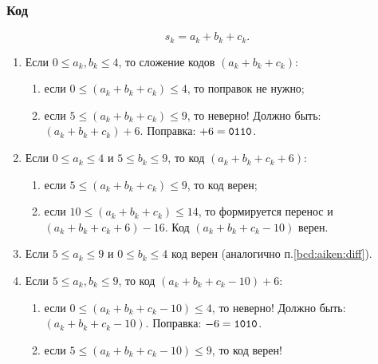 \begin{frame}
    \frametitle{Код \AikenLabel}

    \[
        s_k=a_k+b_k+c_k.
    \]
    
    \begin{enumerate}
        \item Если $0\leq a_{k},b_{k}\leq 4$, то сложение кодов $(a_{k}+b_{k}+c_{k})$:
        \begin{enumerate}
            \item если $0\leq (a_{k}+b_{k}+c_{k}) \leq 4$, то поправок не нужно;
            \item если $5\leq(a_{k}+b_{k}+c_{k}) \leq 9$, то неверно! Должно быть: $(a_{k}+b_{k}+c_{k})+6$. Поправка: $+6=\texttt{0110}$.
        \end{enumerate}

        \item\label{bcd:aiken:diff} Если $0\leq a_{k}\leq 4$ и $5\leq b_{k}\leq 9$, то код $(a_{k}+b_{k}+c_{k}+6)$:
        \begin{enumerate}
            \item если $5\leq (a_{k}+b_{k}+c_{k}) \leq 9$, то код верен;
            \item если $10\leq(a_{k}+b_{k}+c_{k}) \leq 14$, то формируется перенос и $(a_{k}+b_{k}+c_{k}+6)-16$. Код $(a_{k}+b_{k}+c_{k}-10)$ верен.
        \end{enumerate}
        
        \item Если $5\leq a_{k}\leq 9$ и $0\leq b_{k}\leq 4$ код верен (аналогично п.\ref{bcd:aiken:diff}).

        \item Если $5\leq a_{k},b_{k}\leq 9$, то код $(a_{k}+b_{k}+c_{k}-10)+6$:
        \begin{enumerate}
            \item если $0\leq (a_{k}+b_{k}+c_{k}-10) \leq 4$, то неверно! Должно быть: $(a_{k}+b_{k}+c_{k} - 10)$. Поправка: $-6=\texttt{1010}$.
            \item если $5\leq(a_{k}+b_{k}+c_{k}-10) \leq 9$, то код верен!
        \end{enumerate}
    \end{enumerate}
\end{frame}

